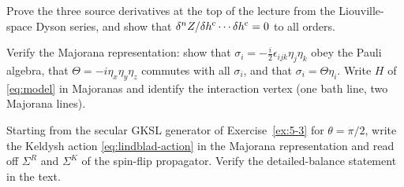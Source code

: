 \begin{exercise}\label{ex:9-1}
Prove the three source derivatives at the top of the lecture from the Liouville-space Dyson series, and show that $\delta^nZ/\delta h^{\mathrm{c}}\cdots\delta h^{\mathrm{c}}=0$ to all orders.
\end{exercise}

\begin{exercise}\label{ex:9-2}
Verify the Majorana representation: show that $\sigma_i=-\tfrac i2\epsilon_{ijk}\eta_j\eta_k$ obey the Pauli algebra, that $\Theta=-i\eta_x\eta_y\eta_z$ commutes with all $\sigma_i$, and that $\sigma_i=\Theta\eta_i$.
Write $H$ of \cref{eq:model} in Majoranas and identify the interaction vertex (one bath line, two Majorana lines).
\end{exercise}

\begin{exercise}\label{ex:9-3}
Starting from the secular GKSL generator of Exercise~\ref{ex:5-3} for $\theta=\pi/2$, write the Keldysh action \eqref{eq:lindblad-action} in the Majorana representation and read off $\Sigma^R$ and $\Sigma^K$ of the spin-flip propagator.
Verify the detailed-balance statement in the text.
\end{exercise}

\clearpage
